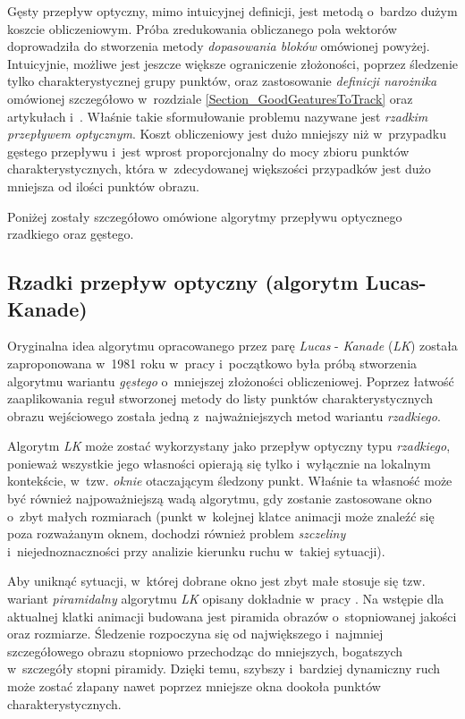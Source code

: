    Gęsty przepływ optyczny, mimo intuicyjnej definicji, jest metodą o~bardzo dużym koszcie obliczeniowym. Próba zredukowania obliczanego pola wektorów doprowadziła do stworzenia metody \textit{dopasowania bloków} omówionej powyżej. Intuicyjnie, możliwe jest jeszcze większe ograniczenie złożoności, poprzez śledzenie tylko charakterystycznej grupy punktów, oraz zastosowanie \textit{definicji narożnika} omówionej szczegółowo w~rozdziale \ref{Section_GoodGeaturesToTrack} oraz artykułach \cite{LucasKanadeTracker81} i~\cite{GoodFeaturesToTrack94}. Właśnie takie sformułowanie problemu nazywane jest \textit{rzadkim przepływem optycznym}. Koszt obliczeniowy jest dużo mniejszy niż w~przypadku gęstego przepływu i~jest wprost proporcjonalny do mocy zbioru punktów charakterystycznych, która w~zdecydowanej większości przypadków jest dużo mniejsza od ilości punktów obrazu.

    Poniżej zostały szczegółowo omówione algorytmy przepływu optycznego rzadkiego oraz gęstego.

    \subsection{Rzadki przepływ optyczny (algorytm Lucas-Kanade)}
    Oryginalna idea algorytmu opracowanego przez parę \textit{Lucas} - \textit{Kanade} (\textit{LK}) została zaproponowana w~1981 roku w~pracy \cite{LucasKanadeTracker81} i~początkowo była próbą stworzenia algorytmu wariantu \textit{gęstego} o~mniejszej złożoności obliczeniowej. Poprzez łatwość zaaplikowania reguł stworzonej metody do listy punktów charakterystycznych obrazu wejściowego została jedną z~najważniejszych metod wariantu \textit{rzadkiego}.

    Algorytm \textit{LK} może zostać wykorzystany jako przepływ optyczny typu \textit{rzadkiego}, ponieważ wszystkie jego własności opierają się tylko i~wyłącznie na lokalnym kontekście, w~tzw. \textit{oknie} otaczającym śledzony punkt. Właśnie ta własność może być również najpoważniejszą wadą algorytmu, gdy zostanie zastosowane okno o~zbyt małych rozmiarach (punkt w~kolejnej klatce animacji może znaleźć się poza rozważanym oknem, dochodzi również problem \textit{szczeliny} i~niejednoznaczności przy analizie kierunku ruchu w~takiej sytuacji).

    Aby uniknąć sytuacji, w~której dobrane okno jest zbyt małe stosuje się tzw. wariant \textit{piramidalny} algorytmu \textit{LK} opisany dokładnie w~pracy \cite{OpenCvOpticalFlow04}. Na wstępie dla aktualnej klatki animacji budowana jest piramida obrazów o~stopniowanej jakości oraz rozmiarze. Śledzenie rozpoczyna się od największego i~najmniej szczegółowego obrazu stopniowo przechodząc do mniejszych, bogatszych w~szczegóły stopni piramidy. Dzięki temu, szybszy i~bardziej dynamiczny ruch może zostać złapany nawet poprzez mniejsze okna dookoła punktów charakterystycznych.

